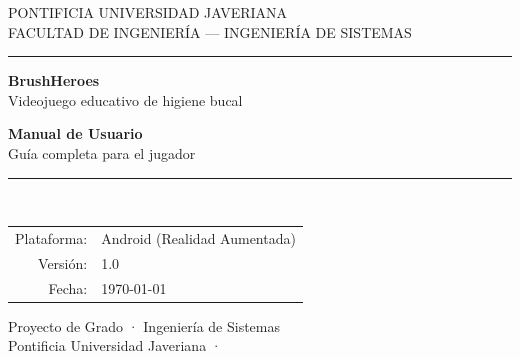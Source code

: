\documentclass[12pt, a4paper]{article}
\let\realincludegraphics\includegraphics
\renewcommand{\includegraphics}[2][]{%
  \IfFileExists{#2}%
    {\realincludegraphics[#1]{#2}}%
    {\fbox{\begin{minipage}[c][3cm][c]{0.5\textwidth}%
       \centering\small\color{gray}%
       \textbf{[imagen pendiente]}\\[4pt]\texttt{#2}%
     \end{minipage}}}%
}
\begin{document}
\begin{titlepage}
  \centering
  \vspace*{1.5cm}

  {\small\color{heroGray} PONTIFICIA UNIVERSIDAD JAVERIANA}\\[0.2cm]
  {\small\color{heroGray} FACULTAD DE INGENIERÍA — INGENIERÍA DE SISTEMAS}\\[0.6cm]
  \rule{0.7\textwidth}{0.8pt}

  \vspace{1.8cm}

  \begin{tcolorbox}[
    colback=heroBlue!8, colframe=heroBlue,
    width=0.55\textwidth, halign=center,
    arc=8pt, boxrule=1.2pt,
    top=18pt, bottom=18pt
  ]
    \centering
    {\LARGE\bfseries\color{heroBlue} BrushHeroes}\\[4pt]
    {\small\color{heroGray} Videojuego educativo de higiene bucal}
  \end{tcolorbox}

  \vspace{1.8cm}

  {\huge\bfseries Manual de Usuario}\\[0.6cm]
  {\large\color{heroGray} Guía completa para el jugador}

  \vspace{1.5cm}
  \rule{0.5\textwidth}{0.4pt}\\[0.8cm]

  \begin{tabular}{r l}
    \color{heroGray}Plataforma:   & Android (Realidad Aumentada) \\
    \color{heroGray}Versión:      & 1.0 \\
    \color{heroGray}Fecha:        & \today \\
  \end{tabular}

  \vfill
  {\small\color{heroGray} Proyecto de Grado · Ingeniería de Sistemas\\
  Pontificia Universidad Javeriana · \the\year}
\end{titlepage}

\renewcommand{\contentsname}{Tabla de contenidos}
\tableofcontents
\newpage
\end{document}

